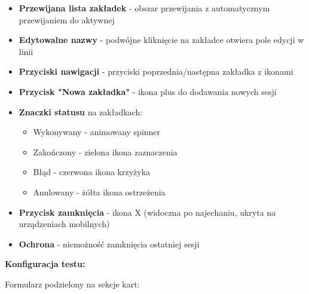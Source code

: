 \documentclass[12pt,a4paper]{article}
\begin{document}
\begin{itemize}
    \item \textbf{Przewijana lista zakładek} - obszar przewijania z automatycznym przewijaniem do aktywnej
    \item \textbf{Edytowalne nazwy} - podwójne kliknięcie na zakładce otwiera pole edycji w linii
    \item \textbf{Przyciski nawigacji} - przyciski poprzednia/następna zakładka z ikonami
    \item \textbf{Przycisk "Nowa zakładka"} - ikona plus do dodawania nowych sesji
    \item \textbf{Znaczki statusu} na zakładkach:
    \begin{itemize}
        \item Wykonywany - animowany spinner
        \item Zakończony - zielona ikona zaznaczenia
        \item Błąd - czerwona ikona krzyżyka
        \item Anulowany - żółta ikona ostrzeżenia
    \end{itemize}
    \item \textbf{Przycisk zamknięcia} - ikona X (widoczna po najechaniu, ukryta na urządzeniach mobilnych)
    \item \textbf{Ochrona} - niemożność zamknięcia ostatniej sesji
\end{itemize}

\textbf{Konfiguracja testu:}

Formularz podzielony na sekcje kart:
\end{document}
